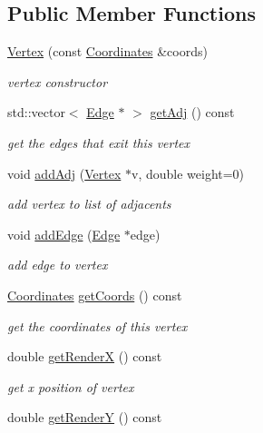 \subsection*{Public Member Functions}
\begin{DoxyCompactItemize}
\item 
\hyperlink{class_vertex_ae86a694fcad11ed1078c3761deaa0d1f}{Vertex} (const \hyperlink{class_coordinates}{Coordinates} \&coords)
\begin{DoxyCompactList}\small\item\em vertex constructor \end{DoxyCompactList}\item 
std\+::vector$<$ \hyperlink{class_edge}{Edge} $\ast$ $>$ \hyperlink{class_vertex_abe6306ddafb1250080563fbe645e382f}{get\+Adj} () const 
\begin{DoxyCompactList}\small\item\em get the edges that exit this vertex \end{DoxyCompactList}\item 
void \hyperlink{class_vertex_a24b15df4ff9b1969ccad22db8187273a}{add\+Adj} (\hyperlink{class_vertex}{Vertex} $\ast$v, double weight=0)
\begin{DoxyCompactList}\small\item\em add vertex to list of adjacents \end{DoxyCompactList}\item 
void \hyperlink{class_vertex_a8680da16057ec72dde00eb7ebf43e4d7}{add\+Edge} (\hyperlink{class_edge}{Edge} $\ast$edge)
\begin{DoxyCompactList}\small\item\em add edge to vertex \end{DoxyCompactList}\item 
\hyperlink{class_coordinates}{Coordinates} \hyperlink{class_vertex_a383f8757d8642562efb1cd36523623fb}{get\+Coords} () const 
\begin{DoxyCompactList}\small\item\em get the coordinates of this vertex \end{DoxyCompactList}\item 
double \hyperlink{class_vertex_a5df81beb3e6f7577891665142da3a000}{get\+Render\+X} () const 
\begin{DoxyCompactList}\small\item\em get x position of vertex \end{DoxyCompactList}\item 
double \hyperlink{class_vertex_a1b50b9fe0d0581df53751c5085f4e077}{get\+Render\+Y} () const 

\end{DoxyCompactItemize}
